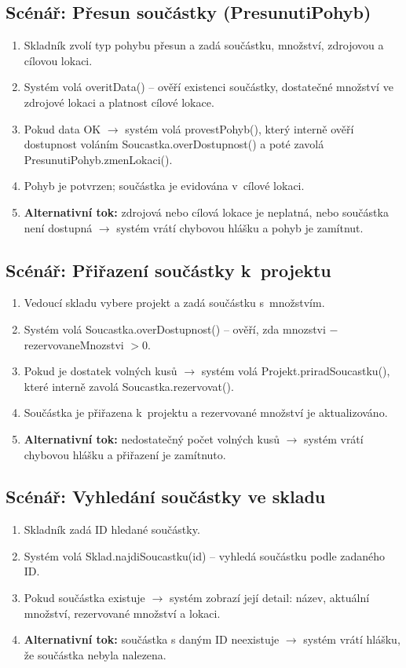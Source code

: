 \subsection{Scénář: Přesun součástky (PresunutiPohyb)}
\begin{enumerate}
  \item Skladník zvolí typ pohybu přesun a zadá součástku, množství, zdrojovou a cílovou lokaci.
  \item Systém volá overitData() -- ověří existenci součástky, dostatečné množství ve zdrojové lokaci a platnost cílové lokace.
  \item Pokud data OK $\rightarrow$ systém volá provestPohyb(), který interně ověří dostupnost voláním Soucastka.overDostupnost() a poté zavolá PresunutiPohyb.zmenLokaci().
  \item Pohyb je potvrzen; součástka je evidována v~cílové lokaci.
  \item \textbf{Alternativní tok:} zdrojová nebo cílová lokace je neplatná, nebo součástka není dostupná $\rightarrow$ systém vrátí chybovou hlášku a pohyb je zamítnut.
\end{enumerate}

\subsection{Scénář: Přiřazení součástky k~projektu}
\begin{enumerate}
  \item Vedoucí skladu vybere projekt a zadá součástku s~množstvím.
  \item Systém volá Soucastka.overDostupnost() -- ověří, zda mnozstvi $-$ rezervovaneMnozstvi $> 0$.
  \item Pokud je dostatek volných kusů $\rightarrow$ systém volá Projekt.priradSoucastku(), které interně zavolá Soucastka.rezervovat().
  \item Součástka je přiřazena k~projektu a rezervované množství je aktualizováno.
  \item \textbf{Alternativní tok:} nedostatečný počet volných kusů $\rightarrow$ systém vrátí chybovou hlášku a přiřazení je zamítnuto.
\end{enumerate}

\subsection{Scénář: Vyhledání součástky ve skladu}
\begin{enumerate}
  \item Skladník zadá ID hledané součástky.
  \item Systém volá Sklad.najdiSoucastku(id) -- vyhledá součástku podle zadaného ID.
  \item Pokud součástka existuje $\rightarrow$ systém zobrazí její detail: název, aktuální množství, rezervované množství a lokaci.
  \item \textbf{Alternativní tok:} součástka s daným ID neexistuje $\rightarrow$ systém vrátí hlášku, že součástka nebyla nalezena.
\end{enumerate}

